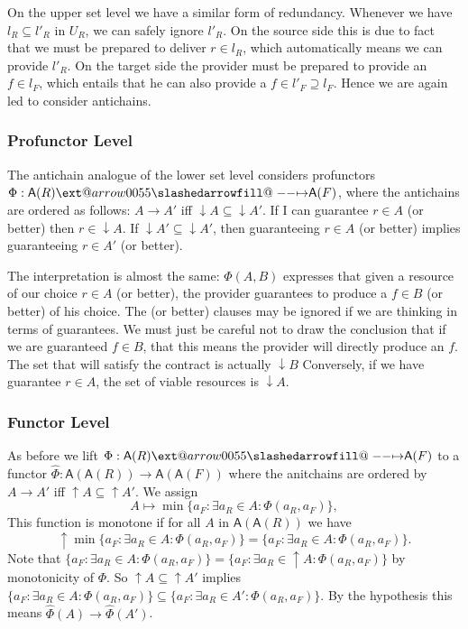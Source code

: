 \documentclass[12pt]{article}
\makeatletter
\theoremstyle{definition}
\theoremstyle{plain}
\theoremstyle{plain}
\theoremstyle{plain}
\theoremstyle{plain}
\theoremstyle{remark}
\theoremstyle{remark}
\newcommand{\sub}{\subseteq}
\newcommand{\ac}{\mathsf{A}}
\def\slashedarrowfill@#1#2#3#4#5{%
	$\m@th\thickmuskip0mu\medmuskip\thickmuskip\thinmuskip\thickmuskip
	\relax#5#1\mkern-7mu%
	\cleaders\hbox{$#5\mkern-2mu#2\mkern-2mu$}\hfill
	\mathclap{#3}\mathclap{#2}%
	\cleaders\hbox{$#5\mkern-2mu#2\mkern-2mu$}\hfill
	\mkern-7mu#4$%
}
\def\rightslashedarrowfill@{%
	\slashedarrowfill@\relbar\relbar\mapstochar\rightarrow}
\newcommand\xslashedrightarrow[2][]{%
	\ext@arrow 0055{\rightslashedarrowfill@}{#1}{#2}}
\makeatother
\begin{document}
On the upper set level we have a similar form of redundancy. Whenever we have $l_R \sub l'_R$ in $U_R$, we can safely ignore $l'_R$. On the source side this is due to fact that we must be prepared to deliver $r \in l_R$, which automatically means we can provide $l'_R$. On the target side the provider must be prepared to provide an $f \in  l_F$, which entails that he can also provide a $f \in l'_F \supseteq l_F$. Hence we are again led to consider antichains.

\subsubsection{Profunctor Level}
The antichain analogue of the lower set level considers profunctors $\Phi: \ac(R) \xslashedrightarrow{} \ac(F)$, where the antichains are ordered as follows: $A \rightarrow A'$ iff $\downarrow A \sub \downarrow A'$. If I can guarantee $r \in A$ (or better) then $r \in \downarrow A$. If $ \downarrow A' \sub \downarrow A'$, then  guaranteeing $r \in A$ (or better) implies guaranteeing $r \in A'$ (or better).

The interpretation is almost the same: $\Phi(A,B)$ expresses that given a resource of our choice $r \in A$ (or better), the provider guarantees to produce a $f \in B$ (or better) of his choice. The (or better) clauses may be ignored if we are thinking in terms of guarantees. We must just be careful not to draw the conclusion that if we are guaranteed $f \in B$, that this means the provider will directly produce an $f$. The set that will satisfy the contract is actually $\downarrow B$ Conversely, if we have guarantee $r \in A$, the set of viable resources is $\downarrow A$.


\subsubsection{Functor Level}
As before we lift $\Phi: \ac(R) \xslashedrightarrow{} \ac(F)$ to a functor $\hat\Phi: \ac(\ac(R)) \rightarrow \ac(\ac(F))$ where the anitchains are ordered by $A \rightarrow A'$ iff $\uparrow A \sub \uparrow A'$. We assign
$$A \mapsto \min\{a_F : \exists a_R \in A : \Phi(a_R,a_F)\},$$
This function is monotone if for all $A$ in $\ac(\ac(R))$ we have $$\uparrow \min \{a_F : \exists a_R \in A : \Phi(a_R,a_F)\} = \{a_F : \exists a_R \in A : \Phi(a_R,a_F)\}.$$ Note that $\{a_F : \exists a_R \in A : \Phi(a_R,a_F)\} = \{a_F : \exists a_R \in \uparrow A : \Phi(a_R,a_F)\}$ by monotonicity of $\Phi$. So $\uparrow A \sub \uparrow A'$ implies $\{a_F : \exists a_R \in A : \Phi(a_R,a_F)\} \sub \{a_F : \exists a_R \in A' : \Phi(a_R,a_F)\}$. By the hypothesis this means $\hat\Phi(A) \rightarrow \hat\Phi(A')$.
\end{document}
